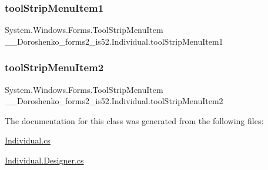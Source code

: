 \subsubsection{\texorpdfstring{tool\+Strip\+Menu\+Item1}{toolStripMenuItem1}}
{\footnotesize\ttfamily System.\+Windows.\+Forms.\+Tool\+Strip\+Menu\+Item \+\_\+\_\+\+Doroshenko\+\_\+forms2\+\_\+is52.\+Individual.\+tool\+Strip\+Menu\+Item1\hspace{0.3cm}{\ttfamily [private]}}

\hypertarget{class__7___doroshenko__forms2__is52_1_1_individual_aac6217256c1c0ec2ec08bb8452b985fc}{}\label{class__7___doroshenko__forms2__is52_1_1_individual_aac6217256c1c0ec2ec08bb8452b985fc} 
\subsubsection{\texorpdfstring{tool\+Strip\+Menu\+Item2}{toolStripMenuItem2}}
{\footnotesize\ttfamily System.\+Windows.\+Forms.\+Tool\+Strip\+Menu\+Item \+\_\+\_\+\+Doroshenko\+\_\+forms2\+\_\+is52.\+Individual.\+tool\+Strip\+Menu\+Item2\hspace{0.3cm}{\ttfamily [private]}}



The documentation for this class was generated from the following files\+:\begin{DoxyCompactItemize}
\item 
\hyperlink{_individual_8cs}{Individual.\+cs}\item 
\hyperlink{_individual_8_designer_8cs}{Individual.\+Designer.\+cs}\end{DoxyCompactItemize}
